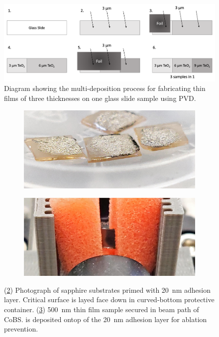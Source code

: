 \begin{figure}[t]
  \centering
  \includegraphics[width=\textwidth]{figs/4-Raman/3TeO2SamplesIn1.png}
  \caption{Diagram showing the multi-deposition process for fabricating  thin films of three thicknesses on one glass slide sample using \ac{PVD}.}
  \label{fig:Raman:3in1}
\end{figure}

\begin{figure}[t]
    \centering
    \begin{subfigure}[b]{0.49\textwidth}
        \centering
        \includegraphics[width=\textwidth]{figs/4-Raman/CINTSamples.png}
        \caption{}
        \label{fig:Raman:CINTSamplesFacedown}
    \end{subfigure}
    \hfill
    \begin{subfigure}[b]{0.49\textwidth}
        \centering
        \includegraphics[width=\textwidth]{figs/4-Raman/TeCINTinFoam.png}
        \caption{}
        \label{fig:Raman:TeCINTinFoam}
    \end{subfigure}
    \caption{(\ref{fig:Raman:CINTSamplesFacedown}) Photograph of sapphire substrates primed with \SI{20}{\nano\meter}  adhesion layer. Critical surface is layed face down in curved-bottom protective container. (\ref{fig:Raman:TeCINTinFoam}) \SI{500}{\nano\meter}  thin film sample secured in beam path of \acl{CoBS}.  is deposited ontop of the \SI{20}{\nano\meter}  adhesion layer for ablation prevention.}
    \label{fig:Raman:CINTSamples}
\end{figure}

